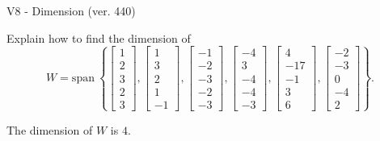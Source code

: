 \begin{exercise}
  \begin{exerciseTitle}V8 - Dimension (ver. 440)\end{exerciseTitle}
  \begin{exerciseStatement}
    Explain how to find the dimension of 
\[W=\mathrm{span}\ \left\{\left[\begin{array}{r}
1 \\
2 \\
3 \\
2 \\
3
\end{array}\right] , \left[\begin{array}{r}
1 \\
3 \\
2 \\
1 \\
-1
\end{array}\right] , \left[\begin{array}{r}
-1 \\
-2 \\
-3 \\
-2 \\
-3
\end{array}\right] , \left[\begin{array}{r}
-4 \\
3 \\
-4 \\
-4 \\
-3
\end{array}\right] , \left[\begin{array}{r}
4 \\
-17 \\
-1 \\
3 \\
6
\end{array}\right] , \left[\begin{array}{r}
-2 \\
-3 \\
0 \\
-4 \\
2
\end{array}\right]\right\}.\]



  \end{exerciseStatement}
  \begin{exerciseAnswer}
   The dimension of \(W\) is  \(4\).
  


  \end{exerciseAnswer}
\end{exercise}